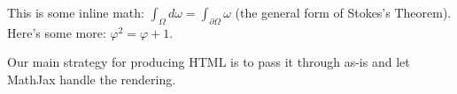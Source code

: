 This is some inline math: $\int_\Omega d\omega = \int_{\partial\Omega} \omega$ (the general form of Stokes's Theorem). Here's some more: \( \varphi^2 = \varphi + 1 \).

Our main strategy for producing HTML is to pass it through as-is and let MathJax handle the rendering. 
